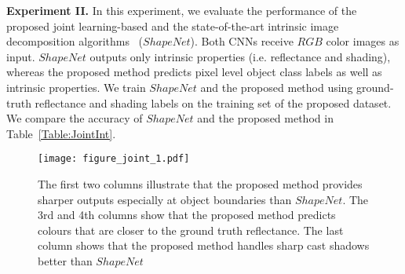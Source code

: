 \documentclass[runningheads]{llncs}
\begin{document}
\noindent \textbf{Experiment II.} In this experiment, we evaluate the performance of the proposed joint learning-based and the state-of-the-art intrinsic image decomposition algorithms~\cite{shi} ($ShapeNet$). Both CNNs receive $RGB$ color images as input. $ShapeNet$ outputs only intrinsic properties (i.e. reflectance and shading), whereas the proposed method predicts pixel level object class labels as well as intrinsic properties. We train $ShapeNet$ and the proposed method using ground-truth reflectance and shading labels on the training set of the proposed dataset. We compare the accuracy of $ShapeNet$ and the proposed method in Table~\ref{Table:JointInt}. 

\begin{table}[h]
\centering
\caption{Influence of joint learning on intrinsic property prediction}
\label{Table:JointInt}
\end{table}

\begin{figure}[h!]
    \centering
    \texttt{[image: figure\_joint\_1.pdf]}
    \caption{The first two columns illustrate that the proposed method provides sharper outputs especially at object boundaries than $ShapeNet$. The 3rd and 4th columns show that the proposed method predicts colours that are closer to the ground truth reflectance. The last column shows that the proposed method handles sharp cast shadows better than $ShapeNet$}
    \label{fig:JointInt}
\end{figure}
\end{document}
